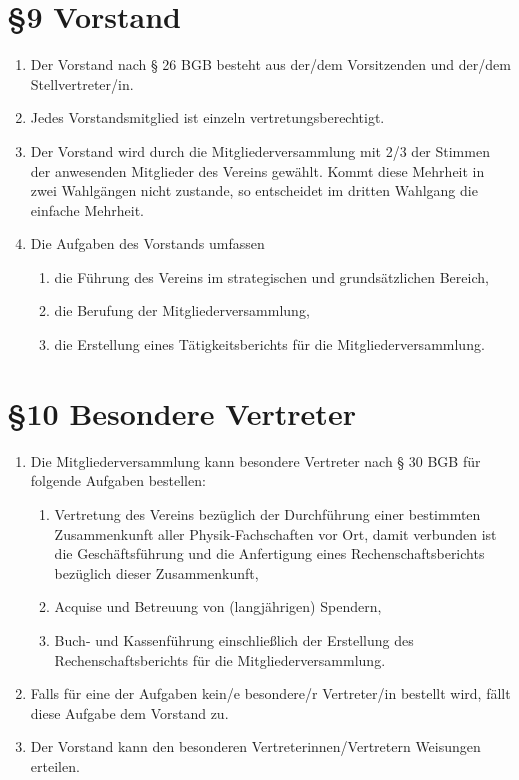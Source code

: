 \documentclass[ngerman]{article}
\begin{document}
\section*{§9 Vorstand}
\begin{enumerate}
 \item Der Vorstand nach § 26 BGB besteht aus der/dem Vorsitzenden und der/dem Stellvertreter/in.
 \item Jedes Vorstandsmitglied ist einzeln vertretungsberechtigt.
 \item Der Vorstand wird durch die Mitgliederversammlung mit 2/3 der Stimmen der anwesenden Mitglieder des Vereins gewählt. Kommt diese Mehrheit in zwei Wahlgängen nicht zustande, so entscheidet im dritten Wahlgang die einfache Mehrheit.
 \item Die Aufgaben des Vorstands umfassen
  \begin{enumerate}
   \item die Führung des Vereins im strategischen und grundsätzlichen Bereich,
   \item die Berufung der Mitgliederversammlung,
   \item die Erstellung eines Tätigkeitsberichts für die Mitgliederversammlung.
  \end{enumerate}
\end{enumerate}


\section*{§10 Besondere Vertreter}
\begin{enumerate}
 \item Die Mitgliederversammlung kann besondere Vertreter nach § 30 BGB für folgende Aufgaben bestellen:
 \begin{enumerate}
  \item Vertretung des Vereins bezüglich der Durchführung einer bestimmten Zusammenkunft aller Physik-Fachschaften vor Ort,
        damit verbunden ist die Geschäftsführung und die Anfertigung eines Rechenschaftsberichts bezüglich dieser Zusammenkunft,
  \item Acquise und Betreuung von (langjährigen) Spendern,
  \item Buch- und Kassenführung einschließlich der Erstellung des Rechenschaftsberichts für die Mitgliederversammlung.
 \end{enumerate}
 \item Falls für eine der Aufgaben kein/e besondere/r Vertreter/in bestellt wird, fällt diese Aufgabe dem Vorstand zu.
 \item Der Vorstand kann den besonderen Vertreterinnen/Vertretern Weisungen erteilen.
\end{enumerate}
\end{document}
